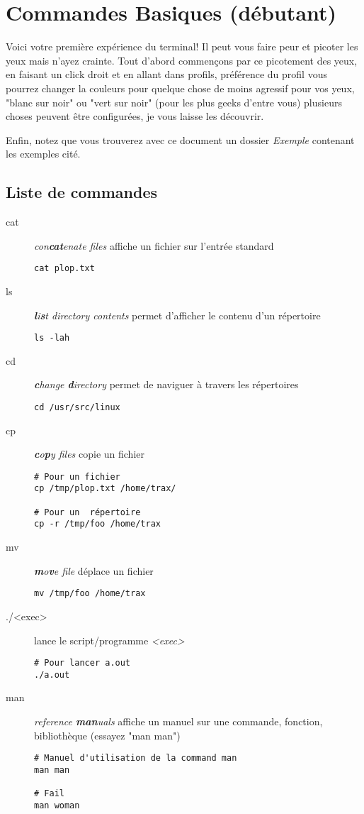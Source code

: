 \documentclass[french, a4paper, 12pt, titlepage]{article}
\begin{document}
\section{Commandes Basiques (débutant)}
Voici votre première expérience du terminal!
Il peut vous faire peur et picoter les yeux mais n'ayez crainte. Tout d'abord commençons par ce picotement des yeux, en faisant un click droit et en allant dans profils, préférence du profil vous pourrez changer la couleurs pour quelque chose de moins agressif pour vos yeux, "blanc sur noir" ou "vert sur noir" (pour les plus geeks d'entre vous) plusieurs choses peuvent être configurées, je vous laisse les découvrir.

Enfin, notez que vous trouverez avec ce document un dossier \emph{Exemple} contenant les exemples cité.

\subsection{Liste de commandes}
\begin{description}
\item[cat] \emph{con\textbf{cat}enate files} affiche un fichier sur l'entrée standard
  \begin{lstlisting}
cat plop.txt
  \end{lstlisting}
\item[ls] \emph{\textbf{l}i\textbf{s}t directory contents} permet d'afficher le contenu d'un répertoire
  \begin{lstlisting}
ls -lah 
  \end{lstlisting}
\item[cd] \emph{\textbf{c}hange \textbf{d}irectory} permet de naviguer à travers les répertoires
  \begin{lstlisting}
cd /usr/src/linux    
  \end{lstlisting}
\item[cp] \emph{\textbf{c}o\textbf{p}y files} copie un fichier
  \begin{lstlisting}
# Pour un fichier
cp /tmp/plop.txt /home/trax/

# Pour un  répertoire
cp -r /tmp/foo /home/trax
  \end{lstlisting}
\item[mv] \emph{\textbf{m}o\textbf{v}e file} déplace un fichier
  \begin{lstlisting}
mv /tmp/foo /home/trax    
  \end{lstlisting}
\item[./<exec>] lance le script/programme \emph{<exec>}
  \begin{lstlisting}
# Pour lancer a.out
./a.out    
  \end{lstlisting}
\item[man] \emph{reference \textbf{man}uals} affiche un manuel sur une commande, fonction, bibliothèque (essayez "man man")
  \begin{lstlisting}
# Manuel d'utilisation de la command man
man man

# Fail
man woman
  \end{lstlisting}
\end{description}
\end{document}

